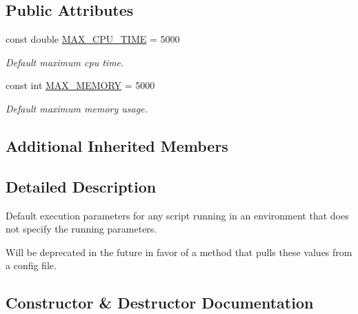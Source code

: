 \subsection*{Public Attributes}
\begin{DoxyCompactItemize}
\item 
const double \mbox{\hyperlink{class_code_a_friend_1_1_data_model_1_1_constants_1_1_default_execution_parameters_a0e3160be940c3cf873575fa86ddf9675}{M\+A\+X\+\_\+\+C\+P\+U\+\_\+\+T\+I\+ME}} = 5000
\begin{DoxyCompactList}\small\item\em Default maximum cpu time. \end{DoxyCompactList}\item 
const int \mbox{\hyperlink{class_code_a_friend_1_1_data_model_1_1_constants_1_1_default_execution_parameters_ae95dd594b14e585446672f9724b44d73}{M\+A\+X\+\_\+\+M\+E\+M\+O\+RY}} = 5000
\begin{DoxyCompactList}\small\item\em Default maximum memory usage. \end{DoxyCompactList}\end{DoxyCompactItemize}
\subsection*{Additional Inherited Members}


\subsection{Detailed Description}
Default execution parameters for any script running in an environment that does not specify the running parameters. 

Will be deprecated in the future in favor of a method that pulls these values from a config file.

\subsection{Constructor \& Destructor Documentation}
\mbox{\label{class_code_a_friend_1_1_data_model_1_1_constants_1_1_default_execution_parameters_a5c8afe78939f6ba8052a2c0ccde9b4dc}} 
